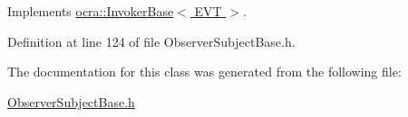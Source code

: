 Implements \hyperlink{classocra_1_1InvokerBase_ae4d7537a1b2c0aa9b5188c5da8423289}{ocra\+::\+Invoker\+Base$<$ E\+V\+T $>$}.



Definition at line 124 of file Observer\+Subject\+Base.\+h.



The documentation for this class was generated from the following file\+:\begin{DoxyCompactItemize}
\item 
\hyperlink{ObserverSubjectBase_8h}{Observer\+Subject\+Base.\+h}\end{DoxyCompactItemize}
